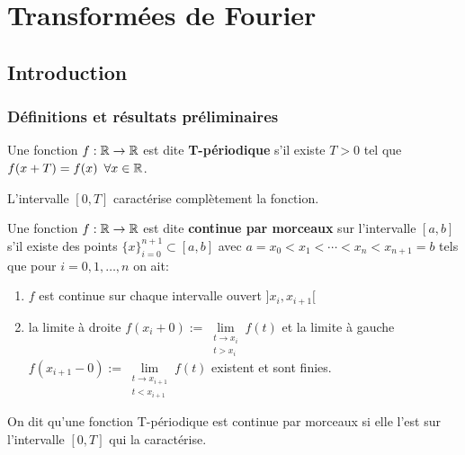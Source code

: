 \chapter{Transformées de Fourier}


\section{Introduction}


\subsection{Définitions et résultats préliminaires}

\begin{definition}
    Une fonction $f: \mathbb{R} \rightarrow \mathbb{R}$ est dite \textbf{T-périodique} s'il existe $T > 0$ tel que $f(x + T) = f(x) \enspace \forall x \in \mathbb{R}$.
    
    L'intervalle $[0, T]$ caractérise complètement la fonction.
\end{definition}


\begin{definition}[14.1.i, p.103]

    Une fonction $f: \mathbb{R} \rightarrow \mathbb{R}$ est dite \textbf{continue par morceaux} sur l'intervalle $[a, b]$ s'il existe des points $ \{x\}_{i = 0}^{n + 1} \subset [a, b]$ avec $a = x_0 < x_1 < \cdots < x_n < x_{n + 1} = b$ tels que pour $i = 0, 1, \ldots, n$ on ait:
    
    \begin{enumerate}

        \item
        $f$ est continue sur chaque intervalle ouvert $]x_i, x_{i + 1}[$

        \item
        la limite à droite $f(x_i + 0) := \lim\limits_{\substack{t \rightarrow x_i \\ t > x_i}} f(t)$ et la limite à gauche $f(x_{i + 1} - 0) := \lim\limits_{\substack{t \rightarrow x_{i+1} \\ t < x_{i+1}}} f(t)$ existent et sont finies.

    \end{enumerate}

\end{definition}


\begin{terminology}
    On dit qu'une fonction T-périodique est continue par morceaux si elle l'est sur l'intervalle $[0, T]$ qui la caractérise.
\end{terminology}


